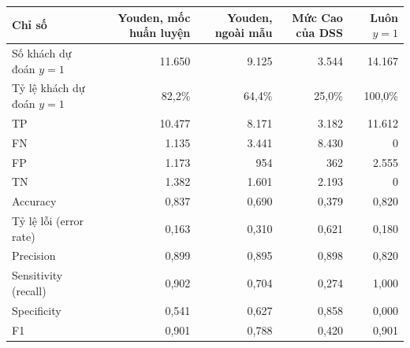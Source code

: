 \begin{tabular}{lrrrr}
\toprule
Chỉ số & Youden, mốc huấn luyện & Youden, ngoài mẫu & Mức Cao của DSS & Luôn $y=1$ \\
\midrule
Số khách dự đoán $y=1$ & 11.650 & 9.125 & 3.544 & 14.167 \\
Tỷ lệ khách dự đoán $y=1$ & 82,2\% & 64,4\% & 25,0\% & 100,0\% \\
TP & 10.477 & 8.171 & 3.182 & 11.612 \\
FN & 1.135 & 3.441 & 8.430 & 0 \\
FP & 1.173 & 954 & 362 & 2.555 \\
TN & 1.382 & 1.601 & 2.193 & 0 \\
Accuracy & 0,837 & 0,690 & 0,379 & 0,820 \\
Tỷ lệ lỗi (error rate) & 0,163 & 0,310 & 0,621 & 0,180 \\
Precision & 0,899 & 0,895 & 0,898 & 0,820 \\
Sensitivity (recall) & 0,902 & 0,704 & 0,274 & 1,000 \\
Specificity & 0,541 & 0,627 & 0,858 & 0,000 \\
F1 & 0,901 & 0,788 & 0,420 & 0,901 \\
\bottomrule
\end{tabular}

